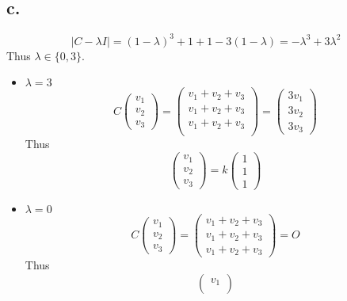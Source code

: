 \documentclass[11pt]{article}
\theoremstyle{mystyle}
\theoremstyle{definition}
\begin{document}
\subsection*{c.}
\[
  |C- \lambda I| = (1-\lambda)^3 + 1 + 1 - 3(1-\lambda) = -\lambda^3 +3\lambda^2
\]
Thus $\lambda \in \{0, 3\}$. \\
\begin{itemize}
  \item $\lambda = 3$ \\
    \[
    C 
    \begin{pmatrix}
      v_1 \\
      v_2 \\
      v_3
    \end{pmatrix} = 
    \begin{pmatrix}
      v_1 + v_2 + v_3 \\
      v_1 + v_2 + v_3 \\
      v_1 + v_2 + v_3 \\
    \end{pmatrix} 
    =
      \begin{pmatrix}
        3v_1 \\
        3v_2 \\
        3v_3 
      \end{pmatrix}
    \]
    Thus 
    \[
      \begin{pmatrix}
        v_1 \\
        v_2 \\
        v_3 
      \end{pmatrix}
      = k 
      \begin{pmatrix}
        1 \\
        1 \\
        1
      \end{pmatrix}
    \]
  \item $\lambda = 0$ \\
    \[
    C 
    \begin{pmatrix}
      v_1 \\
      v_2 \\
      v_3
    \end{pmatrix} = 
    \begin{pmatrix}
      v_1 + v_2 + v_3 \\
      v_1 + v_2 + v_3 \\
      v_1 + v_2 + v_3 
    \end{pmatrix} 
    = 
      O
    \]
    Thus 
    \[
      \begin{pmatrix}
        v_1 \\

\end{pmatrix}\]
\end{itemize}
\end{document}
